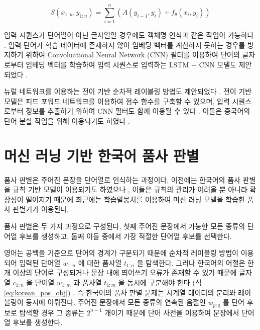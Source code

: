 \documentclass[oneside, ko,phd]{snuthesis_utf8_kor}
\begin{document}
\begin{equation}
  \label{eq:rnn_crf_score}
  S(x_{1:n}, y_{1:n}) = \sum_{i=1}^n \left( A(y_{i-1}, y_i) + f_\theta(x_i, y_i) \right)
\end{equation}

입력 시퀀스가 단어열이 아닌 글자열일 경우에도 객체명 인식과 같은 작업이 가능하다 \cite{gridach2017character}.
입력 단어가 학습 데이터에 존재하지 않아 임베딩 벡터를 계산하지 못하는 경우를 방지하기 위하여 Convoluational Neural Network (CNN) 필터를 이용하여 단어의 글자로부터 임베딩 벡터를 학습하여 입력 시퀀스로 입력하는 LSTM + CNN 모델도 제안되었다 \cite{chiu2016named}.

뉴럴 네트워크를 이용하는 전이 기반 순차적 레이블링 방법도 제안되었다 \cite{zheng2013deep, collobert2011natural, alberti2015improved}.
전이 기반 모델은 피드 포워드 네트워크를 이용하여 점수 함수를 구축할 수 있으며, 입력 시퀀스로부터 정보를 추출하기 위하여 CNN 필터도 함께 이용될 수 있다 \cite{collobert2011natural}.
이들은 중국어의 단어 분할 작업을 위해 이용되기도 하였다 \cite{zhang2016transition, cai2017fast, ballesteros2015improved}.

\section{머신 러닝 기반 한국어 품사 판별}

품사 판별은 주어진 문장을 단어열로 인식하는 과정이다.
이전에는 한국어의 품사 판별을 규칙 기반 모델이 이용되기도 하였으나 \cite{yang2000part, choi1993bidirectional}, 이들은 규칙의 관리가 어려울 뿐 아니라 확장성이 떨어지기 때문에 최근에는 학습말뭉치를 이용하여 머신 러닝 모델을 학습한 품사 판별기가 이용된다.

품사 판별은 두 가지 과정으로 구성된다.
첫째 주어진 문장에서 가능한 모든 종류의 단어열 후보를 생성하고, 둘째 이들 중에서 가장 적절한 단어열 후보를 선택한다.

영어는 공백을 기준으로 단어의 경계가 구분되기 때문에 순차적 레이블링 방법이 이용되어 입력된 단어열 $w_{1:n}$ 에 대한 품사열 $t_{1:n}$ 을 탐색한다.
그러나 한국어의 어절은 한 개 이상의 단어로 구성되거나 문장 내에 띄어쓰기 오류가 존재할 수 있기 때문에 글자열 $c_{1:n}$ 을 단어열 $w_{1:m}$ 과 품사열 $t_{1:m}$ 을 동시에 구분해야 한다 (식 \ref{eq:korean_pos_obj}) \cite{lee2011koreanpos}.
즉 한국어의 품사 판별 문제는 시계열 데이터의 분리와 레이블링이 동시에 이뤄진다.
주어진 문장에서 모든 종류의 연속된 음절인 $w_{p:q}$ 를 단어 후보로 탐색할 경우 그 종류는 $2^{n-1}$ 개이기 때문에 단어 사전을 이용하여 문장에서 단어열 후보를 생성한다.
\end{document}
